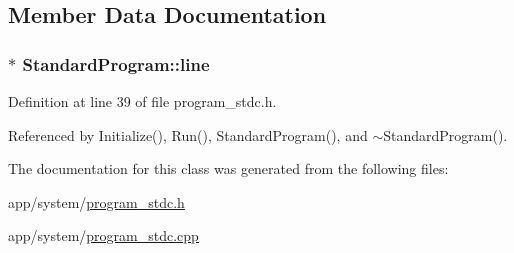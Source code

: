 \subsection{Member Data Documentation}
\subsubsection[{\texorpdfstring{line}{line}}]{$\ast$ Standard\+Program\+::line\hspace{0.3cm}{\ttfamily [private]}}\hypertarget{classStandardProgram_aba785a89c947a8a2c42aec60e98bd9cd}{}\label{classStandardProgram_aba785a89c947a8a2c42aec60e98bd9cd}


Definition at line 39 of file program\+\_\+stdc.\+h.



Referenced by Initialize(), Run(), Standard\+Program(), and $\sim$\+Standard\+Program().



The documentation for this class was generated from the following files\+:\begin{DoxyCompactItemize}
\item 
app/system/\hyperlink{program__stdc_8h}{program\+\_\+stdc.\+h}\item 
app/system/\hyperlink{program__stdc_8cpp}{program\+\_\+stdc.\+cpp}\end{DoxyCompactItemize}
